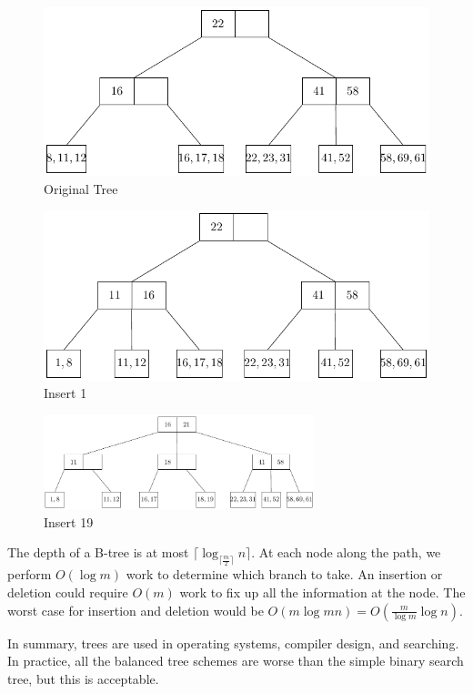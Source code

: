 \begin{minipage}{0.5\textwidth}
\begin{figure}[H]
  \centering
  \includegraphics[width=\textwidth]{Figure/BT-23T-D1.pdf}
  \caption{Original Tree}
\end{figure}
\end{minipage}
\begin{minipage}{0.5\textwidth}
\begin{figure}[H]
  \centering
  \includegraphics[width=\textwidth]{Figure/BT-23T-D2.pdf}
  \caption{Insert 1}
\end{figure}
\end{minipage}
\begin{figure}[H]
  \centering
  \includegraphics[width=0.7\textwidth]{Figure/BT-23T-D3.pdf}
  \caption{Insert 19}
\end{figure}

The depth of a B-tree is at most \(\lceil \log_{\lceil \frac{m}{2} \rceil} n \rceil\). At each node along the path, we perform \(O(\log m)\) work to determine which branch to take. An insertion or deletion could require \(O(m)\) work to fix up all the information at the node. The worst case for insertion and deletion would be \(O(m \log m n) = O\left(\frac{m}{\log m} \log n\right)\).

In summary, trees are used in operating systems, compiler design, and searching. In practice, all the balanced tree schemes are worse than the simple binary search tree, but this is acceptable.
